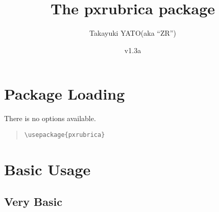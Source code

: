\documentclass[a4paper]{article}
\newcommand*{\PKN}[1]{\textsf{#1}}
\newcommand*{\myfileversion}{1.3a}
\newcommand*{\myfiledate}{2017/05/05}
\begin{document}
\title{The \PKN{pxrubrica} package}
\author{Takayuki YATO\quad (aka ``ZR'')}
\date{v\myfileversion \quad[\myfiledate]}
\maketitle


\section{Package Loading}

There is no options available.

\begin{quote}\small\begin{verbatim}
\usepackage{pxrubrica}
\end{verbatim}\end{quote}

\section{Basic Usage}

\subsection{Very Basic}
\end{document}
